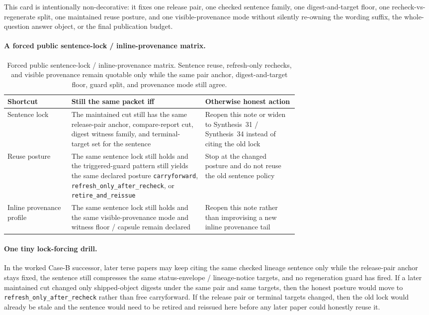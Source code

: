 \documentclass[11pt]{article}
\begin{document}
This card is intentionally non-decorative: it fixes one release pair, one checked sentence family, one digest-and-target floor, one recheck-vs-regenerate split, one maintained reuse posture, and one visible-provenance mode without silently re-owning the wording suffix, the whole-question answer object, or the final publication budget.\cite{series:workedexample}

\paragraph{A forced public sentence-lock / inline-provenance matrix.}
\begin{table}[t]
\centering
\small
\begin{tabularx}{\linewidth}{@{}p{0.22\linewidth}p{0.46\linewidth}X@{}}
\toprule
\textbf{Shortcut} & \textbf{Still the same packet iff} & \textbf{Otherwise honest action}\\
\midrule
Sentence lock & The maintained cut still has the same release-pair anchor, compare-report cut, digest witness family, and terminal-target set for the sentence & Reopen this note or widen to Synthesis~31 / Synthesis~34 instead of citing the old lock \\
Reuse posture & The same sentence lock still holds and the triggered-guard pattern still yields the same declared posture \texttt{carryforward}, \texttt{refresh\_only\_after\_recheck}, or \texttt{retire\_and\_reissue} & Stop at the changed posture and do not reuse the old sentence policy \\
Inline provenance profile & The same sentence lock still holds and the same visible-provenance mode and witness floor / capsule remain declared & Reopen this note rather than improvising a new inline provenance tail \\
\bottomrule
\end{tabularx}
\caption{Forced public sentence-lock / inline-provenance matrix. Sentence reuse, refresh-only rechecks, and visible provenance remain quotable only while the same pair anchor, digest-and-target floor, guard split, and provenance mode still agree.}
\label{tab:forced-sentence-lock-matrix}
\end{table}

\paragraph{One tiny lock-forcing drill.}
In the worked Case-B successor, later terse papers may keep citing the same checked lineage sentence only while the release-pair anchor stays fixed, the sentence still compresses the same status-envelope / lineage-notice targets, and no regeneration guard has fired. If a later maintained cut changed only shipped-object digests under the same pair and same targets, then the honest posture would move to \texttt{refresh\_only\_after\_recheck} rather than free carryforward. If the release pair or terminal targets changed, then the old lock would already be stale and the sentence would need to be retired and reissued here before any later paper could honestly reuse it.\cite{series:workedexample}
\end{document}
